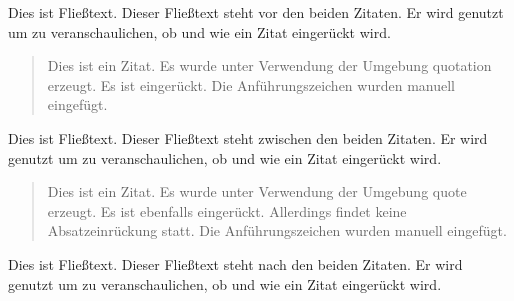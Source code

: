 \documentclass[12pt,a5paper]{book}
\begin{document}
Dies ist Fließtext. Dieser Fließtext steht vor den beiden Zitaten. Er wird genutzt um zu veranschaulichen, ob und wie ein Zitat eingerückt wird. 

\begin{quotation}
\glqq Dies ist ein Zitat. Es wurde unter Verwendung der Umgebung quotation erzeugt. Es ist eingerückt. Die Anführungszeichen wurden manuell eingefügt.\grqq
\end{quotation}

Dies ist Fließtext. Dieser Fließtext steht zwischen den beiden Zitaten. Er wird genutzt um zu veranschaulichen, ob und wie ein Zitat eingerückt wird. 

\begin{quote}
\glqq Dies ist ein Zitat. Es wurde unter Verwendung der Umgebung quote erzeugt. Es ist ebenfalls eingerückt. Allerdings findet keine Absatzeinrückung statt. Die Anführungszeichen wurden manuell eingefügt.\grqq
\end{quote}

Dies ist Fließtext. Dieser Fließtext steht nach den beiden Zitaten. Er wird genutzt um zu veranschaulichen, ob und wie ein Zitat eingerückt wird. 
\end{document}

